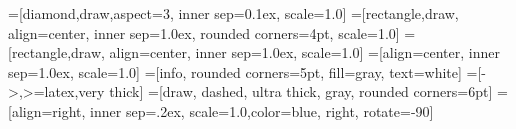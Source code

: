 =[diamond,draw,aspect=3, inner sep=0.1ex, scale=1.0]
=[rectangle,draw, align=center, inner sep=1.0ex, rounded corners=4pt, scale=1.0]
=[rectangle,draw, align=center, inner sep=1.0ex, scale=1.0]
=[align=center, inner sep=1.0ex, scale=1.0]
=[info, rounded corners=5pt, fill=gray, text=white]
=[->,>=latex,very thick]
=[draw, dashed, ultra thick, gray, rounded corners=6pt]
=[align=right, inner sep=.2ex, scale=1.0,color=blue, right, rotate=-90]

\newcommand{\namedBox}[3]%
{\node[box, inner sep=10pt, fit=#1, label={[align=right,xshift={(-0.5ex)},io,rotate={(-90)}]north east:#2}]{};}

\newcommand{\thinNamedBox}[3]%
{\node[box, inner sep=5pt, fit=#1, label={[align=right,xshift={(-0.5ex)},io,rotate={(-90)}]north east:#2}]{};}

\newcommand{\namedIdBox}[4]%
{\node[box, inner sep=10pt, fit=#1, label={[align=right,xshift={(-0.5ex)},io,rotate={(-90)}]north east:#2}] (#4) {};}

\newcommand{\sectionElt}[5]{%
	\pgfmathparse{#3 +0.4}\let\z\pgfmathresult;
	\draw[fill=#5] (#1:#3) arc (#1:#2:#3) -- (#2:\z) arc (#2:#1:\z) -- cycle;


	
}

\newcommand{\fctSection}[4]{%
	\pgfmathparse{#3 +0.4}\let\z\pgfmathresult;
	\draw[fill=gray!40] (#1:#3) arc (#1:#2:#3) -- (#2:\z) arc (#2:#1:\z) -- cycle;
	
	
}

